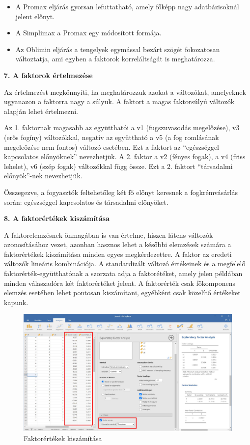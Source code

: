 \documentclass[
  letterpaper,
]{krantz}
\begin{document}
\begin{itemize}
\item
  A Promax eljárás gyorsan lefuttatható, amely főképp nagy
  adatbázisoknál jelent előnyt.
\item
  A Simplimax a Promax egy módosított formája.
\item
  Az Oblimin eljárás a tengelyek egymással bezárt szögét fokozatosan
  változtatja, ami egyben a faktorok korreláltságát is meghatározza.
\end{itemize}

\textbf{7. A faktorok értelmezése}

Az értelmezést megkönnyíti, ha meghatározzuk azokat a változókat,
amelyeknek ugyanazon a faktorra nagy a súlyuk. A faktort a magas
faktorsúlyú változók alapján lehet értelmezni.

Az 1. faktornak magasabb az együtthatói a v1 (fugszuvasodás megelőzése),
v3 (erős fogíny) változókkal, negatív az együttható a v5 (a fog
romlásának megeleőzése nem fontos) változó esetében. Ezt a faktort az
``egészséggel kapcsolatos előnyöknek'' nevezhetjük. A 2. faktor a v2
(fényes fogak), a v4 (friss lehelet), v6 (szép fogak) változókkal függ
össze. Ezt a 2. faktort ``társadalmi előnyök''-nek nevezhetjük.

Összegezve, a fogyasztók feltehetőleg két fő előnyt keresnek a
fogkrémvásárlás során: egészséggel kapcsolatos és társadalmi előnyöket.

\textbf{8. A faktorértékek kiszámítása}

A faktorelemzésnek önmagában is van értelme, hiszen látens változók
azonosításához vezet, azonban hasznos lehet a későbbi elemzések számára
a faktorértékek kiszámítása minden egyes megkérdezettre. A faktor az
eredeti változók lineáris kombinációja. A standardizált változó
értékeinek és a megfelelő faktorérték-együtthatónak a szorzata adja a
faktorétéket, amely jelen példában minden válaszadóra két faktorértéket
jelent. A faktorérték csak főkomponens elemzés esetében lehet pontosan
kiszámítani, egyébként csak közelítő értékeket kapunk.

\begin{figure}

{\centering \includegraphics{./images/efa_fogkrem_04.jpg}

}

\caption{Faktorértékek kiszámítása}

\end{figure}
\end{document}
